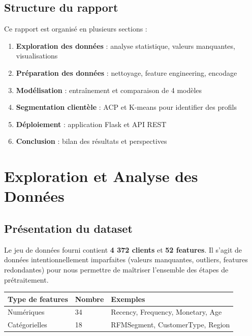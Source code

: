 \documentclass[11pt,a4paper]{article}
\begin{document}
\subsection{Structure du rapport}
Ce rapport est organisé en plusieurs sections :
\begin{enumerate}
    \item \textbf{Exploration des données} : analyse statistique, valeurs manquantes, visualisations
    \item \textbf{Préparation des données} : nettoyage, feature engineering, encodage
    \item \textbf{Modélisation} : entraînement et comparaison de 4 modèles
    \item \textbf{Segmentation clientèle} : ACP et K-means pour identifier des profils
    \item \textbf{Déploiement} : application Flask et API REST
    \item \textbf{Conclusion} : bilan des résultats et perspectives
\end{enumerate}

\newpage
\section{Exploration et Analyse des Données}

\subsection{Présentation du dataset}
Le jeu de données fourni contient \textbf{4 372 clients} et \textbf{52 features}. 
Il s'agit de données intentionnellement imparfaites (valeurs manquantes, outliers, 
features redondantes) pour nous permettre de maîtriser l'ensemble des étapes de 
prétraitement.

\begin{tcolorbox}[title=�� Structure des données]
\begin{tabular}{L{4cm} C{3cm} C{3cm}}
\toprule
\textbf{Type de features} & \textbf{Nombre} & \textbf{Exemples} \\
\midrule
Numériques & 34 & Recency, Frequency, Monetary, Age \\
Catégorielles & 18 & RFMSegment, CustomerType, Region \\
\bottomrule
\end{tabular}
\end{tcolorbox}
\end{document}
